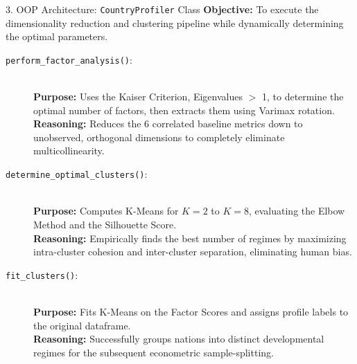 \documentclass[aspectratio=169]{beamer}
\begin{document}
\begin{frame}{3. OOP Architecture: \texttt{CountryProfiler} Class}
  \footnotesize 
  \textbf{Objective:} To execute the dimensionality reduction and clustering pipeline while dynamically determining the optimal parameters.
  \vspace{0.1cm}

  \begin{description}
      \item[\texttt{perform\_factor\_analysis()}:] \hfill \\
      \textbf{Purpose:} Uses the Kaiser Criterion, Eigenvalues $>$ 1, to determine the optimal number of factors, then extracts them using Varimax rotation. \\
      \textbf{Reasoning:} Reduces the 6 correlated baseline metrics down to unobserved, orthogonal dimensions to completely eliminate multicollinearity.

      \item[\texttt{determine\_optimal\_clusters()}:] \hfill \\
      \textbf{Purpose:} Computes K-Means for $K=2$ to $K=8$, evaluating the Elbow Method and the Silhouette Score. \\
      \textbf{Reasoning:} Empirically finds the best number of regimes by maximizing intra-cluster cohesion and inter-cluster separation, eliminating human bias.

      \item[\texttt{fit\_clusters()}:] \hfill \\
      \textbf{Purpose:} Fits K-Means on the Factor Scores and assigns profile labels to the original dataframe. \\
      \textbf{Reasoning:} Successfully groups nations into distinct developmental regimes for the subsequent econometric sample-splitting.
  \end{description}
\end{frame}
\end{document}
